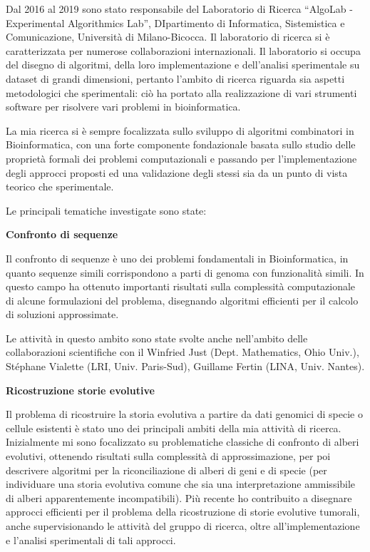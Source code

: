 \documentclass[11pt,a4paper,roman]{moderncv}        %
\begin{document}
  Dal 2016 al 2019 sono stato responsabile del Laboratorio di Ricerca
  ``AlgoLab - Experimental Algorithmics Lab'', DIpartimento di
  Informatica, Sistemistica e Comunicazione, Università di Milano-Bicocca.
  Il laboratorio di ricerca si è caratterizzata per numerose
  collaborazioni internazionali. Il laboratorio si occupa del disegno di
  algoritmi, della loro implementazione e dell'analisi sperimentale su
  dataset di grandi dimensioni, pertanto l'ambito di ricerca riguarda sia
  aspetti metodologici che sperimentali: ciò ha portato alla realizzazione
  di vari strumenti software per risolvere vari problemi in
  bioinformatica.

  La mia ricerca si è sempre focalizzata sullo sviluppo di algoritmi
  combinatori in Bioinformatica, con una forte componente fondazionale
  basata sullo studio delle proprietà formali dei problemi computazionali
  e passando per l'implementazione degli approcci proposti ed una
  validazione degli stessi sia da un punto di vista teorico che
  sperimentale.

  Le principali tematiche investigate sono state:

  \textbf{Confronto di sequenze}

  Il confronto di sequenze è uno dei problemi fondamentali in
  Bioinformatica, in quanto sequenze simili corrispondono a parti di
  genoma con funzionalità simili. In questo campo ha ottenuto importanti
  risultati sulla complessità computazionale di alcune formulazioni del
  problema, disegnando algoritmi efficienti per il calcolo di soluzioni
  approssimate.

  Le attività in questo ambito sono state svolte anche nell'ambito delle
  collaborazioni scientifiche con il Winfried Just (Dept. Mathematics,
  Ohio Univ.), Stéphane Vialette (LRI, Univ. Paris-Sud), Guillame Fertin
  (LINA, Univ. Nantes).

  \textbf{Ricostruzione storie evolutive}

  Il problema di ricostruire la storia evolutiva a partire da dati
  genomici di specie o cellule esistenti è stato uno dei principali ambiti
  della mia attività di ricerca. Inizialmente mi sono focalizzato su
  problematiche classiche di confronto di alberi evolutivi, ottenendo
  risultati sulla complessità di approssimazione, per poi descrivere
  algoritmi per la riconciliazione di alberi di geni e di specie (per
  individuare una storia evolutiva comune che sia una interpretazione
  ammissibile di alberi apparentemente incompatibili). Più recente ho
  contribuito a disegnare approcci efficienti per il problema della
  ricostruzione di storie evolutive tumorali, anche supervisionando le
  attività del gruppo di ricerca, oltre all'implementazione e l'analisi
  sperimentali di tali approcci.
\end{document}
